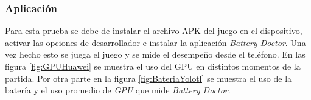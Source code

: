 \subsubsection{Aplicación}
Para esta prueba se debe de instalar el archivo APK del juego en el dispositivo,
activar las opciones de desarrollador e instalar la aplicación
\textit{Battery Doctor}.  Una vez hecho esto se juega el juego y se mide el
desempeño desde el teléfono. En las figura \ref{fig:GPUHuawei} se muestra el
uso del GPU en distintos momentos de la partida. Por otra parte en la figura
\ref{fig:BateriaYolotl} se muestra el uso de la batería y el uso promedio de
\textit{GPU} que mide \textit{Battery Doctor}.
\\
\par
\begin{figure}
  \centering
 
   
   
   
   

\end{figure}
